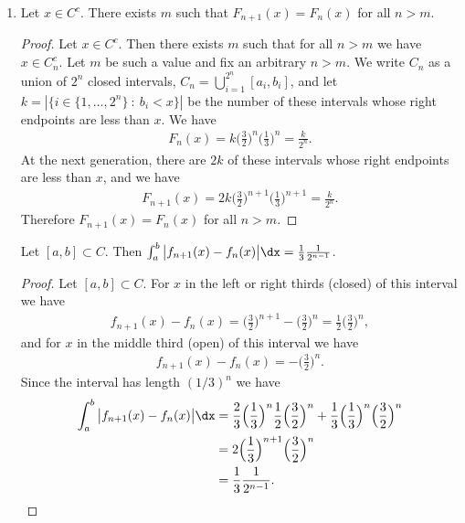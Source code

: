 \begin{enumerate}[label=(4.\arabic*)]

\item
  \begin{lemma*}\label{lemma-4-1-1}
    Let $x \in C^c$. There exists $m$ such that $F_{n+1}(x) = F_n(x)$ for all $n > m$.
  \end{lemma*}
  \begin{proof}
    Let $x \in C^c$. Then there exists $m$ such that for all $n > m$ we have $x \in C_n^c$. Let $m$ be such a
    value and fix an arbitrary $n > m$. We write $C_n$ as a union of $2^n$ closed
    intervals, $C_n = \bigcup_{i=1}^{2^n} [a_i, b_i]$, and let $k = |\{i \in \{1, \ldots, 2^n\} ~:~ b_i < x\}|$
    be the number of these intervals whose right endpoints are less than $x$. We have
    \begin{align*}
      F_n(x) = k\Big(\frac{3}{2}\Big)^n\Big(\frac{1}{3}\Big)^n = \frac{k}{2^n}.
    \end{align*}
    At the next generation, there are $2k$ of these intervals whose right endpoints are less than $x$, and we
    have
    \begin{align*}
      F_{n+1}(x) = 2k\Big(\frac{3}{2}\Big)^{n+1}\Big(\frac{1}{3}\Big)^{n+1} = \frac{k}{2^n}.
    \end{align*}
    Therefore $F_{n+1}(x) = F_n(x)$ for all $n > m$.
  \end{proof}


  \begin{lemma*}\label{lemma-4-1-2}
    Let $[a, b] \subset C$. Then $\int_a^b \big|f_{n+1}(x) - f_n(x)\big| \dx = \frac{1}{3}\frac{1}{2^{n-1}}$.
  \end{lemma*}

  \begin{proof}
    Let $[a, b] \subset C$. For $x$ in the left or right thirds (closed) of this interval we have
    \begin{align*}
      f_{n+1}(x) - f_n(x)
      = \Big(\frac{3}{2}\Big)^{n+1} - \Big(\frac{3}{2}\Big)^{n}
      = \frac{1}{2}\Big(\frac{3}{2}\Big)^n,
    \end{align*}
    and for $x$ in the middle third (open) of this interval we have
    \begin{align*}
      f_{n+1}(x) - f_n(x)
      = -\Big(\frac{3}{2}\Big)^{n}.
    \end{align*}
    Since the interval has length $(1/3)^n$ we have
    \begin{align*}
      \int_a^b \big|f_{n+1}(x) - f_n(x)\big| \dx
      &=  \frac{2}{3}\Big(\frac{1}{3}\Big)^n\frac{1}{2}\Big(\frac{3}{2}\Big)^n
        + \frac{1}{3}\Big(\frac{1}{3}\Big)^n\Big(\frac{3}{2}\Big)^n \\
      &= 2\Big(\frac{1}{3}\Big)^{n+1}\Big(\frac{3}{2}\Big)^n\\
      &= \frac{1}{3}\frac{1}{2^{n-1}}.
    \end{align*}
  \end{proof}


\end{enumerate}

